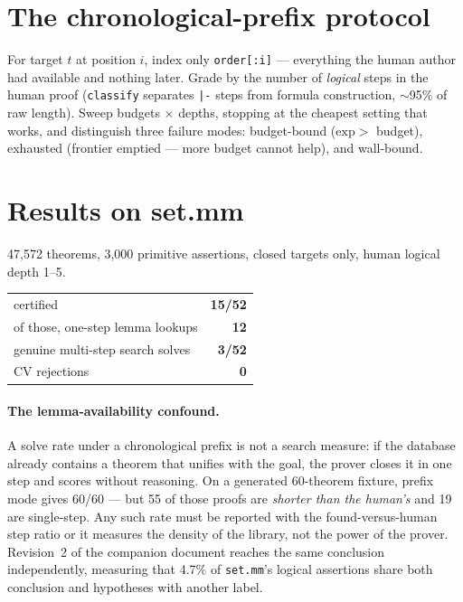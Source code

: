 \documentclass[11pt,a4paper]{article}
\begin{document}
\section{The chronological-prefix protocol}

For target $t$ at position $i$, index only \texttt{order[:i]} --- everything the
human author had available and nothing later. Grade by the number of
\emph{logical} steps in the human proof (\texttt{classify} separates
\texttt{|-} steps from formula construction, $\sim$95\% of raw length). Sweep
budgets $\times$ depths, stopping at the cheapest setting that works, and
distinguish three failure modes: budget-bound ($\mathrm{exp} > $ budget),
exhausted (frontier emptied --- more budget cannot help), and wall-bound.

\section{Results on set.mm}

47{,}572 theorems, 3{,}000 primitive assertions, closed targets only, human
logical depth 1--5.

\begin{center}
\begin{tabular}{@{}lr@{}}
\toprule
certified & \textbf{15/52} \\
of those, one-step lemma lookups & \textbf{12} \\
genuine multi-step search solves & \textbf{3/52} \\
CV rejections & \textbf{0} \\
\bottomrule
\end{tabular}
\end{center}

\paragraph{The lemma-availability confound.} A solve rate under a chronological
prefix is not a search measure: if the database already contains a theorem that
unifies with the goal, the prover closes it in one step and scores without
reasoning. On a generated 60-theorem fixture, prefix mode gives 60/60 --- but 55
of those proofs are \emph{shorter than the human's} and 19 are single-step. Any
such rate must be reported with the found-versus-human step ratio or it
measures the density of the library, not the power of the prover. Revision~2 of
the companion document reaches the same conclusion independently, measuring
that 4.7\% of \texttt{set.mm}'s logical assertions share both conclusion and
hypotheses with another label.
\end{document}
